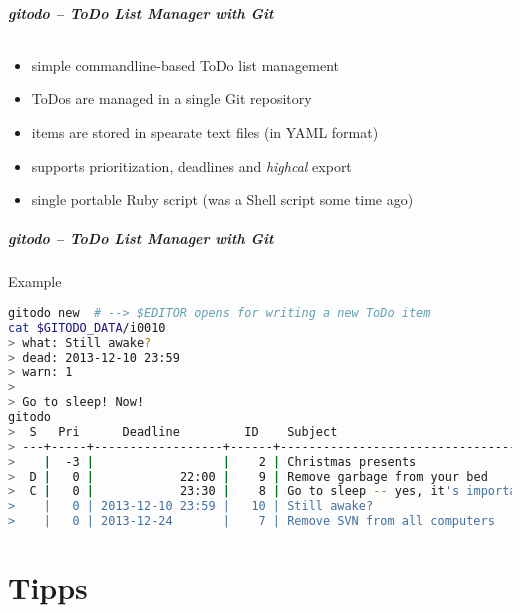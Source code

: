 \documentclass[english,hyperref={pdfpagelabels=false},aspectratio=169]{beamer}
\begin{document}
\begin{frame}[label=gitodo]
  \frametitle{gitodo -- ToDo List Manager with Git}
  \framesubtitle{}
  \begin{itemize}
    \item simple commandline-based ToDo list management
    \item ToDos are managed in a single Git repository
    \item items are stored in spearate text files {\scriptsize\color{fzjgray50}(in YAML format)}
    \item supports prioritization, deadlines and \textit{highcal} export
    \item single portable Ruby script {\scriptsize\color{fzjgray50}(was a Shell script some time ago)}
  \end{itemize}
\end{frame}

\begin{frame}[fragile]
  \frametitle{gitodo -- ToDo List Manager with Git}
  \begin{block}{Example}
    \vspace{-0.75em}
    \begin{lstlisting}[language=zsh]
gitodo new  # --> $EDITOR opens for writing a new ToDo item
cat $GITODO_DATA/i0010
> what: Still awake?
> dead: 2013-12-10 23:59
> warn: 1
>
> Go to sleep! Now!
gitodo
>  S   Pri      Deadline         ID    Subject
> ---+-----+------------------+------+-----------------------------------
>    |  -3 |                  |    2 | Christmas presents
>  D |   0 |            22:00 |    9 | Remove garbage from your bed
>  C |   0 |            23:30 |    8 | Go to sleep -- yes, it's important
>    |   0 | 2013-12-10 23:59 |   10 | Still awake?
>    |   0 | 2013-12-24       |    7 | Remove SVN from all computers
    \end{lstlisting}
    \vspace{-0.75em}
  \end{block}
\end{frame}


\part{Tipps}
\makepart
\end{document}
